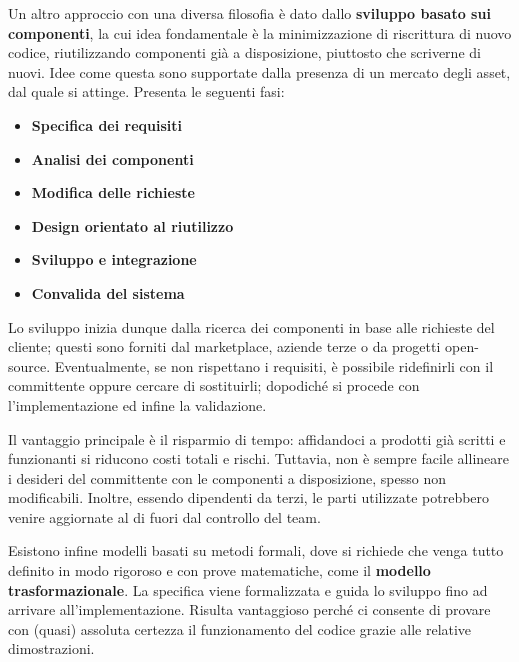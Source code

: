 \noindent Un altro approccio con una diversa filosofia è dato dallo \textbf{sviluppo basato sui componenti}, la cui idea fondamentale è la minimizzazione di riscrittura di nuovo codice, riutilizzando componenti già a disposizione, piuttosto che scriverne di nuovi. Idee come questa sono supportate dalla presenza di un mercato degli asset, dal quale si attinge. Presenta le seguenti fasi: \begin{itemize}
	\item \textbf{Specifica dei requisiti}
	\item \textbf{Analisi dei componenti}
	\item \textbf{Modifica delle richieste}
	\item \textbf{Design orientato al riutilizzo}
	\item \textbf{Sviluppo e integrazione}
	\item \textbf{Convalida del sistema}
\end{itemize}
\noindent Lo sviluppo inizia dunque dalla ricerca dei componenti in base alle richieste del cliente; questi sono forniti dal marketplace, aziende terze o da progetti open-source. Eventualmente, se non rispettano i requisiti, è possibile ridefinirli con il committente oppure cercare di sostituirli; dopodiché si procede con l'implementazione ed infine la validazione.\par
Il vantaggio principale è il risparmio di tempo: affidandoci a prodotti già scritti e funzionanti si riducono costi totali e rischi. Tuttavia, non è sempre facile allineare i desideri del committente con le componenti a disposizione, spesso non modificabili. Inoltre, essendo dipendenti da terzi, le parti utilizzate potrebbero venire aggiornate al di fuori dal controllo del team.\par
Esistono infine modelli basati su metodi formali, dove si richiede che venga tutto definito in modo rigoroso e con prove matematiche, come il \textbf{modello trasformazionale}. La specifica viene formalizzata e guida lo sviluppo fino ad arrivare all'implementazione. Risulta vantaggioso perché ci consente di provare con (quasi) assoluta certezza il funzionamento del codice grazie alle relative dimostrazioni.\newline

